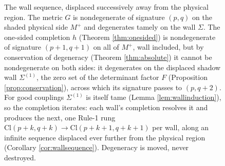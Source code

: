\documentclass[11pt]{article}
\theoremstyle{definition}
\newcommand{\Cl}{\mathrm{Cl}}
\newcommand{\Sig}{\Sigma}
\newcommand{\Mp}{M^{+}}
\begin{document}
\begin{figure}[t]
\centering
{}
\caption{The wall sequence, displaced successively away from the physical region. The metric $G$ is nondegenerate of signature $(p,q)$ on the shaded physical side $\Mp$ and degenerates tamely on the wall $\Sig$. The one-sided completion $h$ (Theorem \ref{thm:onesided}) is nondegenerate of signature $(p{+}1,q{+}1)$ on all of $\Mp$, wall included, but by conservation of degeneracy (Theorem \ref{thm:absolute}) it cannot be nondegenerate on both sides: it degenerates on the displaced shadow wall $\Sig^{(1)}$, the zero set of the determinant factor $F$ (Proposition \ref{prop:conservation}), across which its signature passes to $(p,q{+}2)$. For good couplings $\Sig^{(1)}$ is itself tame (Lemma \ref{lem:wallinduction}), so the completion iterates: each wall's completion resolves it and produces the next, one Rule-1 rung $\Cl(p{+}k,q{+}k) \to \Cl(p{+}k{+}1,q{+}k{+}1)$ per wall, along an infinite sequence displaced ever further from the physical region (Corollary \ref{cor:wallsequence}). Degeneracy is moved, never destroyed.}
\label{fig:wallsequence}
\end{figure}
\end{document}
